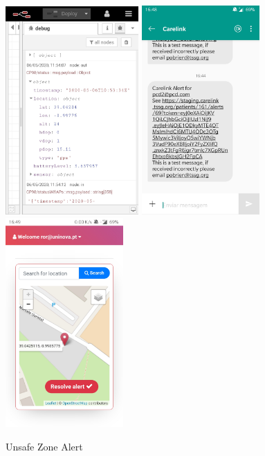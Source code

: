 \begin{figure}[htbp]
  \centering
    {\includegraphics[height=8cm,width=0.3\linewidth]{Chapters/Figures/gpsnodered.jpg}}%
    {\includegraphics[height=8cm,width=0.3\linewidth]{Chapters/Figures/smsalert.jpg}}%
    {\includegraphics[height=8cm,width=0.3\linewidth]{Chapters/Figures/webalert.jpg}}%
  \caption{Unsafe Zone Alert }
  \label{fig:Unsafe Zone Alert}
\end{figure}

